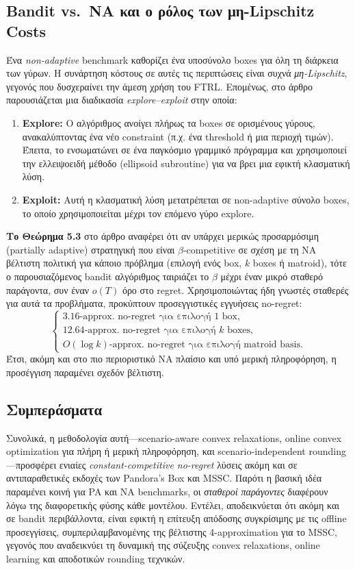 \documentclass[11pt,a4paper]{article}
\begin{document}
\subsection*{Bandit vs.\ NA και ο ρόλος των μη-Lipschitz Costs}
Ένα \emph{non-adaptive} benchmark καθορίζει ένα υποσύνολο boxes για όλη τη διάρκεια των γύρων. Η συνάρτηση κόστους σε αυτές τις περιπτώσεις είναι συχνά \emph{μη-Lipschitz}, γεγονός που δυσχεραίνει την άμεση χρήση του FTRL. Επομένως, στο άρθρο παρουσιάζεται μια διαδικασία \emph{explore–exploit} στην οποία:
\begin{enumerate}
\item \textbf{Explore:} Ο αλγόριθμος ανοίγει πλήρως τα boxes σε ορισμένους γύρους, ανακαλύπτοντας ένα νέο constraint (π.χ. ένα threshold ή μια περιοχή τιμών). Έπειτα, το ενσωματώνει σε ένα παγκόσμιο γραμμικό πρόγραμμα και χρησιμοποιεί την ελλειψοειδή μέθοδο (ellipsoid subroutine) για να βρει μια εφικτή κλασματική λύση.
\item \textbf{Exploit:} Αυτή η κλασματική λύση μετατρέπεται σε non-adaptive σύνολο boxes, το οποίο χρησιμοποιείται μέχρι τον επόμενο γύρο explore.
\end{enumerate}
\textbf{Το Θεώρημα 5.3} στο άρθρο αναφέρει ότι αν υπάρχει μερικώς προσαρμόσιμη (partially adaptive) στρατηγική που είναι \(\beta\)-competitive σε σχέση με τη NA βέλτιστη πολιτική για κάποιο πρόβλημα (επιλογή ενός box, $k$ boxes ή matroid), τότε ο παρουσιαζόμενος bandit αλγόριθμος ταιριάζει το \(\beta\) μέχρι έναν μικρό σταθερό παράγοντα, συν έναν \(o(T)\) όρο στο regret. Χρησιμοποιώντας ήδη γνωστές σταθερές για αυτά τα προβλήματα, προκύπτουν προσεγγιστικές εγγυήσεις no-regret:
\[
\begin{cases}
3.16\text{-approx.\ no-regret για επιλογή 1 box},\\
12.64\text{-approx.\ no-regret για επιλογή $k$ boxes},\\
O(\log k)\text{-approx.\ no-regret για επιλογή matroid basis}.
\end{cases}
\]
Έτσι, ακόμη και στο πιο περιοριστικό NA πλαίσιο και υπό μερική πληροφόρηση, η προσέγγιση παραμένει σχεδόν βέλτιστη.

\subsection*{Συμπεράσματα}
Συνολικά, η μεθοδολογία αυτή—scenario-aware convex relaxations, online convex optimization για πλήρη ή μερική πληροφόρηση, και scenario-independent rounding—προσφέρει ενιαίες \emph{constant-competitive no-regret} λύσεις ακόμη και σε αντιπαραθετικές εκδοχές των Pandora’s Box και MSSC. Παρότι η βασική ιδέα παραμένει κοινή για PA και NA benchmarks, οι \emph{σταθεροί παράγοντες} διαφέρουν λόγω της διαφορετικής φύσης κάθε μοντέλου. Εντέλει, αποδεικνύεται ότι ακόμη και σε bandit περιβάλλοντα, είναι εφικτή η επίτευξη απόδοσης συγκρίσιμης με τις offline προσεγγίσεις, συμπεριλαμβανομένης της βέλτιστης 4-approximation για το MSSC, γεγονός που αναδεικνύει τη δυναμική της σύζευξης convex relaxations, online learning και αποδοτικών rounding τεχνικών.
\end{document}
